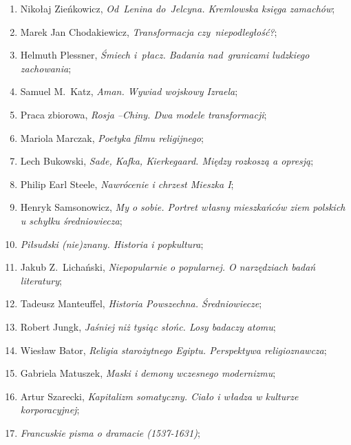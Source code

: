\documentclass[a4paper,11pt]{article}
\begin{document}
\begin{enumerate}
\item Nikołaj Zieńkowicz, \emph{Od~Lenina do~Jelcyna. Kremlowska
    księga zamachów};

\item Marek Jan Chodakiewicz, \emph{Transformacja czy~niepodległość?};

\item Helmuth Plessner, \emph{Śmiech i~płacz. Badania nad~granicami
    ludzkiego zachowania};

\item Samuel M.~Katz, \emph{Aman. Wywiad wojskowy Izraela};

\item Praca zbiorowa, \emph{Rosja --Chiny. Dwa modele transformacji};

\item Mariola Marczak, \emph{Poetyka filmu religijnego};

\item Lech Bukowski, \emph{Sade, Kafka, Kierkegaard. Między rozkoszą a
    opresją};

\item Philip Earl Steele, \emph{Nawrócenie i chrzest Mieszka I};

\item Henryk Samsonowicz, \emph{My o sobie. Portret własny mieszkańców
    ziem polskich u schyłku średniowiecza};

\item \emph{Piłsudski (nie)znany. Historia i popkultura};

\item Jakub Z.~Lichański, \emph{Niepopularnie o popularnej. O
    narzędziach badań literatury};

\item Tadeusz Manteuffel, \emph{Historia Powszechna. Średniowiecze};

\item Robert Jungk, \emph{Jaśniej niż tysiąc słońc. Losy badaczy
    atomu};

\item Wiesław Bator, \emph{Religia starożytnego Egiptu. Perspektywa
    religioznawcza};

\item Gabriela Matuszek, \emph{Maski i demony wczesnego modernizmu};

\item Artur Szarecki, \emph{Kapitalizm somatyczny. Ciało i władza w
    kulturze korporacyjnej};

\item \emph{Francuskie pisma o dramacie (1537-1631)};


\end{enumerate}
\end{document}
